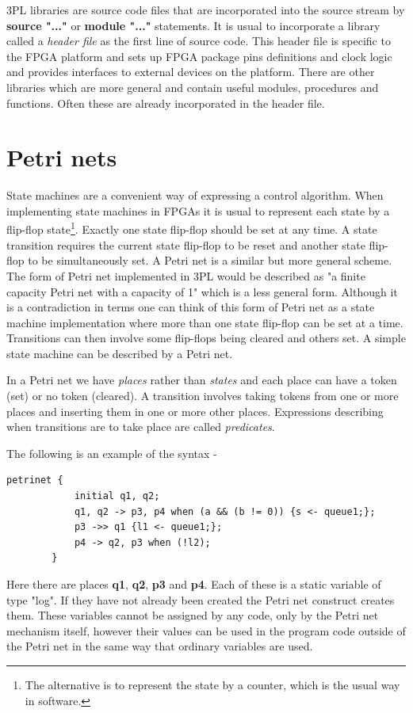 \documentclass[10pt,a4paper,twoside,fleqn]{article}
\newcommand{\var}[1]{{\bf #1}} %
\begin{document}
    3PL libraries are source code files that are incorporated into the source
    stream by {\bf source "..."} or {\bf module "..."} statements. It is usual to
    incorporate a library called a {\em header file} as the first line of source
    code. This header file is specific to the FPGA platform and sets up FPGA
    package pins definitions and clock logic and provides interfaces to
    external devices on the platform. There are other libraries which are more
    general and contain useful modules, procedures and functions. Often these
    are already incorporated in the header file.



\section{Petri nets}

    State machines are a convenient way of expressing a control algorithm. When
    implementing state machines in FPGAs it is usual to represent each state
    by a flip-flop state\footnote{The alternative is to represent the state
    by a counter, which is the usual way in software.}. Exactly one state
    flip-flop should be set at any time. A state transition requires the
    current state flip-flop to be reset and another state flip-flop to be
    simultaneously set. A Petri net is a similar but more general scheme.
    The form of Petri net implemented in 3PL would be described as "a finite
    capacity Petri net with a capacity of 1" which is a less general form.
    Although it is a contradiction in terms one can think of this form of
    Petri net as a state machine implementation where more than one state
    flip-flop can be set at a time. Transitions can then involve some
    flip-flops being cleared and others set. A simple state machine can
    be described by a Petri net.
    
    In a Petri net we have {\em places} rather than {\em states} and each place
    can have a token (set) or no token (cleared). A transition involves taking
    tokens from one or more places and inserting them in one or more other places.
    Expressions describing when transitions are to take place are called
    {\em predicates}.

\pagebreak    
    The following is an example of the syntax -
    \begin{lstlisting}[language=threepl]
        petrinet {
            initial q1, q2;
            q1, q2 -> p3, p4 when (a && (b != 0)) {s <- queue1;};
            p3 ->> q1 {l1 <- queue1;};
            p4 -> q2, p3 when (!l2);
        }
    \end{lstlisting}
    Here there are places \var{q1}, \var{q2}, \var{p3} and \var{p4}. Each of these
    is a static variable of type "log". If they have not already been created the
    Petri net construct creates them. These variables cannot be assigned by any
    code, only by the Petri net mechanism itself, however their values can be used
    in the program code outside of the Petri net in the same way that ordinary
    variables are used.
    
\end{document}
